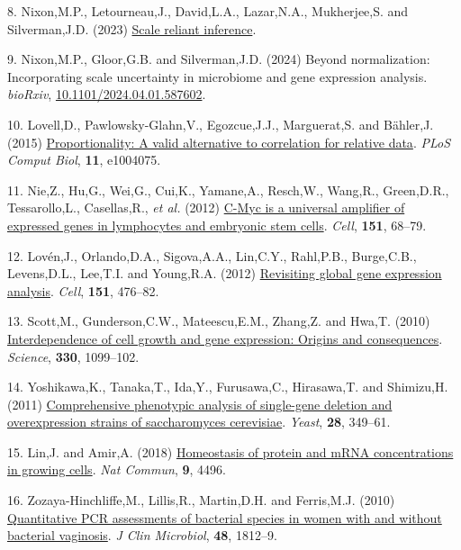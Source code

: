 \documentclass[
]{article}
\newlength{\cslhangindent}
\newenvironment{CSLReferences}[2] %
 {\begin{list}{}{%
  \setlength{\itemindent}{0pt}
  \setlength{\leftmargin}{0pt}
  \setlength{\parsep}{0pt}
  \ifodd #1
   \setlength{\leftmargin}{\cslhangindent}
   \setlength{\itemindent}{-1\cslhangindent}
  \fi
  \setlength{\itemsep}{#2\baselineskip}}}
 {\end{list}}
\begin{document}
\begin{CSLReferences}{1}{1}
8. Nixon,M.P., Letourneau,J., David,L.A., Lazar,N.A., Mukherjee,S. and
Silverman,J.D. (2023) \href{https://arxiv.org/abs/2201.03616}{Scale
reliant inference}.

9. Nixon,M.P., Gloor,G.B. and Silverman,J.D. (2024) Beyond
normalization: Incorporating scale uncertainty in microbiome and gene
expression analysis. \emph{bioRxiv},
\href{https://doi.org/10.1101/2024.04.01.587602}{10.1101/2024.04.01.587602}.

10. Lovell,D., Pawlowsky-Glahn,V., Egozcue,J.J., Marguerat,S. and
Bähler,J. (2015)
\href{https://doi.org/10.1371/journal.pcbi.1004075}{Proportionality: A
valid alternative to correlation for relative data}. \emph{PLoS Comput
Biol}, \textbf{11}, e1004075.

11. Nie,Z., Hu,G., Wei,G., Cui,K., Yamane,A., Resch,W., Wang,R.,
Green,D.R., Tessarollo,L., Casellas,R., \emph{et al.} (2012)
\href{https://doi.org/10.1016/j.cell.2012.08.033}{C-{M}yc is a universal
amplifier of expressed genes in lymphocytes and embryonic stem cells}.
\emph{Cell}, \textbf{151}, 68--79.

12. Lovén,J., Orlando,D.A., Sigova,A.A., Lin,C.Y., Rahl,P.B.,
Burge,C.B., Levens,D.L., Lee,T.I. and Young,R.A. (2012)
\href{https://doi.org/10.1016/j.cell.2012.10.012}{Revisiting global gene
expression analysis}. \emph{Cell}, \textbf{151}, 476--82.

13. Scott,M., Gunderson,C.W., Mateescu,E.M., Zhang,Z. and Hwa,T. (2010)
\href{https://doi.org/10.1126/science.1192588}{Interdependence of cell
growth and gene expression: Origins and consequences}. \emph{Science},
\textbf{330}, 1099--102.

14. Yoshikawa,K., Tanaka,T., Ida,Y., Furusawa,C., Hirasawa,T. and
Shimizu,H. (2011) \href{https://doi.org/10.1002/yea.1843}{Comprehensive
phenotypic analysis of single-gene deletion and overexpression strains
of saccharomyces cerevisiae}. \emph{Yeast}, \textbf{28}, 349--61.

15. Lin,J. and Amir,A. (2018)
\href{https://doi.org/10.1038/s41467-018-06714-z}{Homeostasis of protein
and mRNA concentrations in growing cells}. \emph{Nat Commun},
\textbf{9}, 4496.

16. Zozaya-Hinchliffe,M., Lillis,R., Martin,D.H. and Ferris,M.J. (2010)
\href{https://doi.org/10.1128/JCM.00851-09}{Quantitative PCR assessments
of bacterial species in women with and without bacterial vaginosis}.
\emph{J Clin Microbiol}, \textbf{48}, 1812--9.


\end{CSLReferences}
\end{document}
